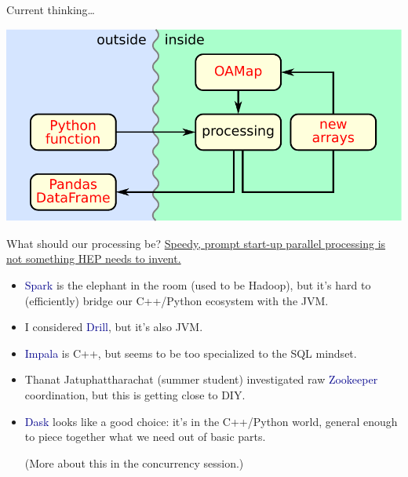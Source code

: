 \documentclass[aspectratio=169]{beamer}
\begin{document}
\begin{frame}{Current thinking\ldots}
\vspace{0.5 cm}
\begin{center}
\includegraphics[width=0.7\linewidth]{block-diagram-output.pdf}
\end{center}
\end{frame}

\begin{frame}{What should our processing be?}
\vspace{0.5 cm}
\underline{Speedy, prompt start-up parallel processing is not something HEP needs to invent.}

\vspace{0.25 cm}
\begin{itemize}\setlength{\itemsep}{0.25 cm}
\item<2-> \textcolor{darkblue}{Spark} is the elephant in the room (used to be Hadoop), but it's hard to (efficiently) bridge our C++/Python ecosystem with the JVM.

\item<3-> I considered \textcolor{darkblue}{Drill}, but it's also JVM.

\item<4-> \textcolor{darkblue}{Impala} is C++, but seems to be too specialized to the SQL mindset.

\item<5-> Thanat Jatuphattharachat (summer student) investigated raw \textcolor{darkblue}{Zookeeper} coordination, but this is getting close to DIY.

\item<6-> \textcolor{darkblue}{Dask} looks like a good choice: it's in the C++/Python world, general enough to piece together what we need out of basic parts.

\vspace{0.25 cm}
(More about this in the concurrency session.)
\end{itemize}
\end{frame}
\end{document}
